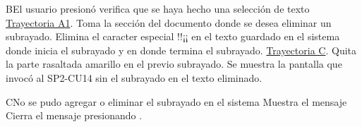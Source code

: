 \begin{UCtrayectoriaA}{B}{El usuario presionó }
\hypertarget{SP2-CU14-B}{}
    \UCpaso verifica que se haya hecho una selección de texto \hyperlink{SP2-CU14-A1}{Trayectoria A1}.
    \UCpaso Toma la sección del documento donde se desea eliminar un subrayado.
    \UCpaso Elimina el caracter especial !!¡¡ en el texto guardado en el sistema donde inicia el subrayado y en donde termina el subrayado. \hyperlink{SP2-CU14-C}{Trayectoria C}.
    \UCpaso Quita la parte rasaltada amarillo en el previo subrayado.
     \UCpaso Se muestra la pantalla que invocó al SP2-CU14 sin el subrayado en el texto eliminado.

\end{UCtrayectoriaA}

\begin{UCtrayectoriaA}{C}{No se pudo agregar o eliminar el subrayado en el sistema}
\hypertarget{SP2-CU14-C}{}
  \UCpaso Muestra el mensaje 
  \UCpaso[\UCactor] Cierra el mensaje presionando .
\end{UCtrayectoriaA}